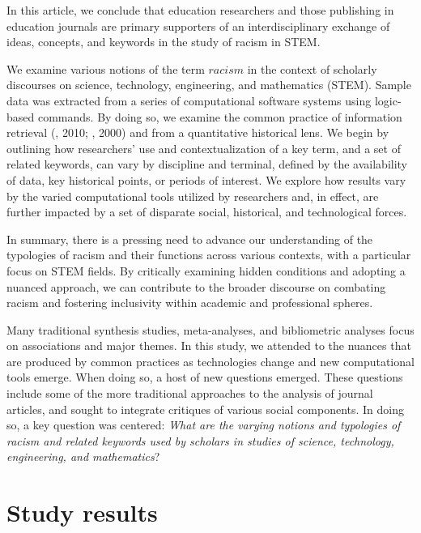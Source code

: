 In this article, we conclude that education researchers and those publishing in education journals are primary supporters of an interdisciplinary exchange of ideas, concepts, and keywords in the study of racism in STEM.

\newpage

We examine various notions of the term $racism$ in the context of scholarly discourses on science, technology, engineering, and mathematics (STEM). Sample data was extracted from a series of computational software systems using logic-based commands. By doing so, we examine the common practice of information retrieval (\cite{chowdhury2010intro}, 2010; \cite{kobayashi2000info}, 2000) and from a quantitative historical lens. We begin by outlining how researchers' use and contextualization of a key term, and a set of related keywords, can vary by discipline and terminal, defined by the availability of data, key historical points, or periods of interest. We explore how results vary by the varied computational tools utilized by researchers and, in effect, are further impacted by a set of disparate social, historical, and technological forces.

In summary, there is a pressing need to advance our understanding of the typologies of racism and their functions across various contexts, with a particular focus on STEM fields. By critically examining hidden conditions and adopting a nuanced approach, we can contribute to the broader discourse on combating racism and fostering inclusivity within academic and professional spheres.




Many traditional synthesis studies, meta-analyses, and bibliometric analyses focus on associations and major themes. In this study, we attended to the nuances that are produced by common practices as technologies change and new computational tools emerge. When doing so, a host of new questions emerged. These questions include some of the more traditional approaches to the analysis of journal articles, and sought to integrate critiques of various social components. In doing so, a key question was centered: \textit{What are the varying notions and typologies of racism and related keywords used by scholars in studies of science, technology, engineering, and mathematics}?

\section{Study results}

